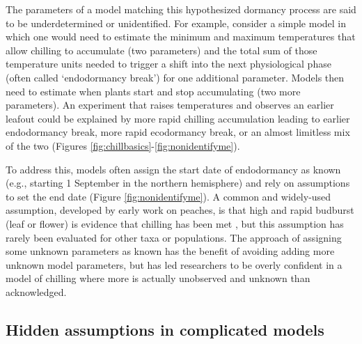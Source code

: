 \documentclass[11pt]{article}
\begin{document}
The parameters of a model matching this hypothesized dormancy process are said to be underdetermined or unidentified. For example, consider a simple model in which one would need to estimate the minimum and maximum temperatures that allow chilling to accumulate (two parameters) and the total sum of those temperature units needed to trigger a shift into the next physiological phase (often called `endodormancy break') for one additional parameter. Models then need to estimate when plants start and stop accumulating (two more parameters). An experiment that raises temperatures and observes an earlier leafout could be explained by more rapid chilling accumulation leading to earlier endodormancy break, more rapid ecodormancy break, or an almost limitless mix of the two (Figures \ref{fig:chillbasics}-\ref{fig:nonidentifyme}). %

To address this, models often assign the start date of endodormancy as known (e.g., starting 1 September in the northern hemisphere) and rely on assumptions to set the end date (Figure \ref{fig:nonidentifyme}). A common and widely-used assumption, developed by early work on peaches, is that high and rapid budburst (leaf or flower) is evidence that chilling has been met \citep[i.e. endodormancy has ended,][see also Figure \ref{fig:chillbasics}]{erez1971}, but this assumption has rarely been evaluated for other taxa or populations. The approach of assigning some unknown parameters as known has the benefit of avoiding adding more unknown model parameters, but has led researchers to be overly confident in a model of chilling where more is actually unobserved and unknown than acknowledged. 

\subsection*{Hidden assumptions in complicated models}
\end{document}
